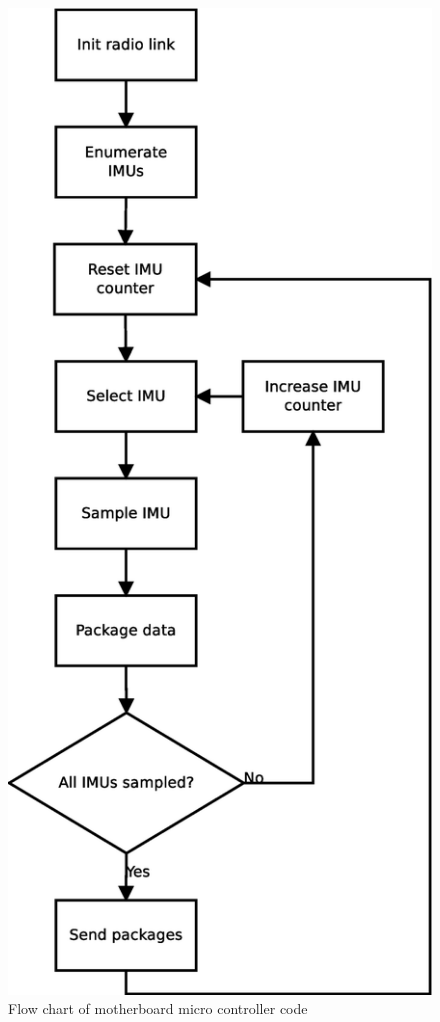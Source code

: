 \documentclass[a4paper, 12pt]{article}
\begin{document}
\begin{figure}[H]
    \centering
    \includegraphics[scale=0.4]{micro.eps}
    \caption{Flow chart of motherboard micro controller code}
    \label{fig:pic3}
\end{figure}
\end{document}
